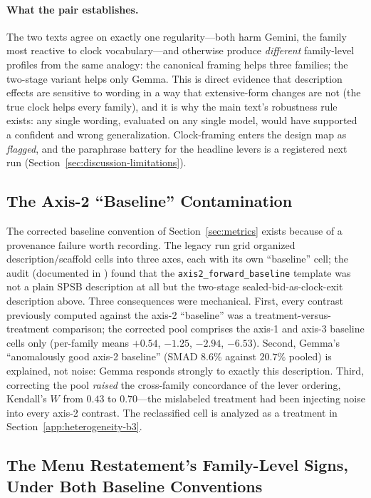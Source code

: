 \paragraph{What the pair establishes.}
The two texts agree on exactly one regularity---both harm Gemini, the family most reactive to clock vocabulary---and otherwise produce \emph{different} family-level profiles from the same analogy: the canonical framing helps three families; the two-stage variant helps only Gemma. This is direct evidence that description effects are sensitive to wording in a way that extensive-form changes are not (the true clock helps every family), and it is why the main text's robustness rule exists: any single wording, evaluated on any single model, would have supported a confident and wrong generalization. Clock-framing enters the design map as \emph{flagged}, and the paraphrase battery for the headline levers is a registered next run (Section~\ref{sec:discussion-limitations}).

\subsection{The Axis-2 ``Baseline'' Contamination}\label{app:heterogeneity-axis2}

The corrected baseline convention of Section~\ref{sec:metrics} exists because of a provenance failure worth recording. The legacy run grid organized description/scaffold cells into three axes, each with its own ``baseline'' cell; the audit (documented in ) found that the \texttt{axis2\_forward\_baseline} template was not a plain SPSB description at all but the two-stage sealed-bid-as-clock-exit description above. Three consequences were mechanical. First, every contrast previously computed against the axis-2 ``baseline'' was a treatment-versus-treatment comparison; the corrected pool comprises the axis-1 and axis-3 baseline cells only (per-family means $+0.54$, $-1.25$, $-2.94$, $-6.53$). Second, Gemma's ``anomalously good axis-2 baseline'' (SMAD $8.6\%$ against $20.7\%$ pooled) is explained, not noise: Gemma responds strongly to exactly this description. Third, correcting the pool \emph{raised} the cross-family concordance of the lever ordering, Kendall's $W$ from $0.43$ to $0.70$---the mislabeled treatment had been injecting noise into every axis-2 contrast. The reclassified cell is analyzed as a treatment in Section~\ref{app:heterogeneity-b3}.

\subsection{The Menu Restatement's Family-Level Signs, Under Both Baseline Conventions}\label{app:heterogeneity-menu}

